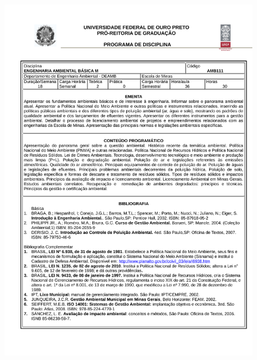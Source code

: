 \begin{figure}[p]
	\centering 
	\includegraphics[scale=0.7]{capitulos/anexo1-programas-disciplina/p51.pdf}
\end{figure}

